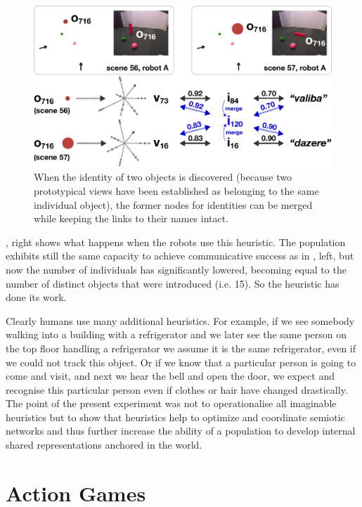 \begin{figure}[htbp]
  \centerline{\includegraphics[width=.75\textwidth]{chap11/figs/adjust-id}}
\caption{\footnotesize\label{fig:png-optimisation} 
When the identity of two objects is discovered (because two prototypical views have been established 
as belonging to the same individual object), the former nodes for identities can be merged while keeping the 
links to their names intact. 
}
\end{figure}

, right shows what happens when the robots use this heuristic. The population
exhibits still the same capacity to achieve communicative success as
in , left, but now the number of individuals
has significantly lowered, becoming equal to the number of distinct objects 
that were introduced (i.e. 15). So the heuristic has done its work. 

Clearly humans use many additional heuristics. For example, if we see somebody walking into a
building with a refrigerator and we later see the same person on the
top floor handling a refrigerator we assume it is the same
refrigerator, even if we could not track this object. Or if we know that a particular person is 
going to come and visit, and next we hear the bell and open the door, we expect and recognise this particular 
person even if clothes or hair have changed drastically. The
point of the present experiment was not to operationalise all imaginable heuristics but to
show that heuristics help to optimize and coordinate semiotic
networks and thus further increase the ability of a population to develop internal shared
representations anchored in the world.

\section{Action Games} 

